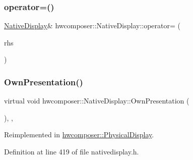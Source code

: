 \subsubsection{\texorpdfstring{operator=()}{operator=()}}
{\footnotesize\ttfamily \mbox{\hyperlink{classhwcomposer_1_1NativeDisplay}{Native\+Display}}\& hwcomposer\+::\+Native\+Display\+::operator= (\begin{DoxyParamCaption}\item[{const \mbox{\hyperlink{classhwcomposer_1_1NativeDisplay}{Native\+Display}} \&}]{rhs }\end{DoxyParamCaption})\hspace{0.3cm}{\ttfamily [delete]}}

\mbox{\label{classhwcomposer_1_1NativeDisplay_a47b40cd84fa21b50202ff14831826ae9}} 
\subsubsection{\texorpdfstring{Own\+Presentation()}{OwnPresentation()}}
{\footnotesize\ttfamily virtual void hwcomposer\+::\+Native\+Display\+::\+Own\+Presentation (\begin{DoxyParamCaption}\item[{\mbox{\hyperlink{classhwcomposer_1_1NativeDisplay}{Native\+Display}} $\ast$}]{ }\end{DoxyParamCaption})\hspace{0.3cm}{\ttfamily [inline]}, {\ttfamily [protected]}, {\ttfamily [virtual]}}



Reimplemented in \mbox{\hyperlink{classhwcomposer_1_1PhysicalDisplay_a3e66e1f2bd3cff0c0ad7e99b8d5fb2ba}{hwcomposer\+::\+Physical\+Display}}.



Definition at line 419 of file nativedisplay.\+h.


\begin{DoxyCode}{0}
\end{DoxyCode}
\mbox{\label{classhwcomposer_1_1NativeDisplay_af03b22112e421559c5f59837a2209716}} 
